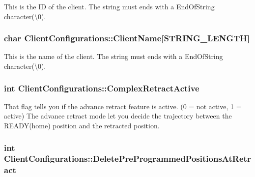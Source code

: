 This is the ID of the client. The string must ends with a End\+Of\+String character(\textbackslash{}0). 

\subsubsection[{\texorpdfstring{Client\+Name}{ClientName}}]{\setlength{\rightskip}{0pt plus 5cm}char Client\+Configurations\+::\+Client\+Name\mbox{[}{\bf S\+T\+R\+I\+N\+G\+\_\+\+L\+E\+N\+G\+TH}\mbox{]}}\hypertarget{struct_client_configurations_a6ec42489c6a1e74a654809f5f39ca6f8}{}\label{struct_client_configurations_a6ec42489c6a1e74a654809f5f39ca6f8}


This is the name of the client. The string must ends with a End\+Of\+String character(\textbackslash{}0). 

\subsubsection[{\texorpdfstring{Complex\+Retract\+Active}{ComplexRetractActive}}]{\setlength{\rightskip}{0pt plus 5cm}int Client\+Configurations\+::\+Complex\+Retract\+Active}\hypertarget{struct_client_configurations_aa41bf35ba1a1dd92f54a30814d42f795}{}\label{struct_client_configurations_aa41bf35ba1a1dd92f54a30814d42f795}


That flag tells you if the advance retract feature is active. (0 = not active, 1 = active) The advance retract mode let you decide the trajectory between the R\+E\+A\+D\+Y(home) position and the retracted position. 

\subsubsection[{\texorpdfstring{Delete\+Pre\+Programmed\+Positions\+At\+Retract}{DeletePreProgrammedPositionsAtRetract}}]{\setlength{\rightskip}{0pt plus 5cm}int Client\+Configurations\+::\+Delete\+Pre\+Programmed\+Positions\+At\+Retract}\hypertarget{struct_client_configurations_ab0dca6d6259625fafd1c725533337460}{}\label{struct_client_configurations_ab0dca6d6259625fafd1c725533337460}


